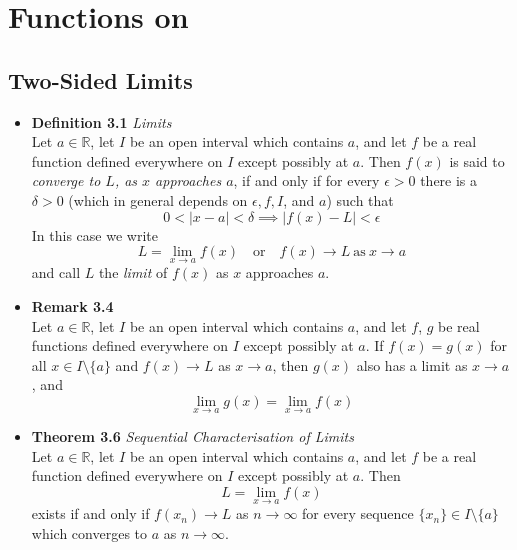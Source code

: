 \documentclass[11pt,a4paper]{article}
\begin{document}
\break{}

\section{Functions on }

\subsection{Two-Sided Limits}

\begin{itemize}
    \item \textbf{Definition 3.1} \emph{Limits} \\
        Let $a \in \mathbb{R}$, let $I$ be an open interval which contains $a$, and let $f$ be
        a real function defined everywhere on $I$ except possibly at $a$.
        Then $f(x)$ is said to \emph{converge to $L$, as $x$ approaches $a$},
        if and only if for every $\epsilon > 0$ there is a $\delta > 0$
        (which in general depends on $\epsilon, f, I$, and $a$) such that
        \[
            0 < |x - a| < \delta \implies |f(x) - L| < \epsilon
        \]
        In this case we write
        \[
            L = \lim_{x \to a} f(x) \quad \text{or} \quad f(x) \to L \ \text{as} \ x \to a
        \]
        and call $L$ the \emph{limit} of $f(x)$ as $x$ approaches $a$.

    \item \textbf{Remark 3.4} \\
        Let $a \in \mathbb{R}$, let $I$ be an open interval which contains $a$, and let
        $f$, $g$ be real functions defined everywhere on $I$ except possibly at $a$.
        If $f(x) = g(x)$ for all $x \in I \setminus \{a\}$ and $f(x) \to L$ as
        $x \to a$, then $g(x)$ also has a limit as $x \to a$, and
        \[
            \lim_{x \to a} g(x) = \lim_{x \to a} f(x)
        \]

    \item \textbf{Theorem 3.6} \emph{Sequential Characterisation of Limits} \\
        Let $a \in \mathbb{R}$, let $I$ be an open interval which contains $a$, and let
        $f$ be a real function defined everywhere on $I$ except possibly at $a$.
        Then
        \[
            L = \lim_{x \to a} f(x)
        \]
        exists if and only if $f(x_n) \to L$ as $n \to \infty$ for every sequence
        $\{x_n\} \in I \setminus \{a\}$ which converges to $a$ as $n \to \infty$.


\end{itemize}
\end{document}
